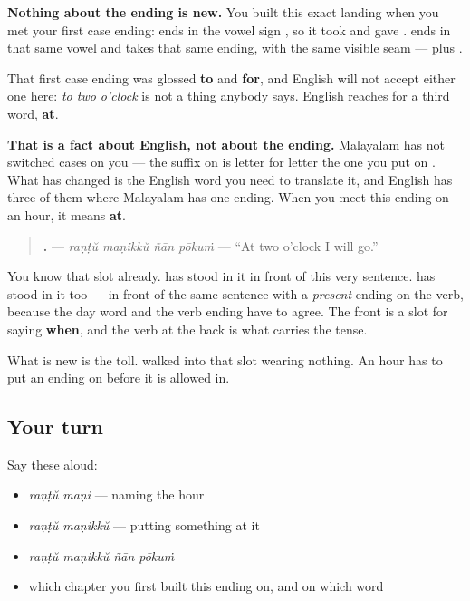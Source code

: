 \textbf{Nothing about the ending is new.} You built this exact landing when you met your first case ending: \textbf{} ends in the vowel sign \textbf{}, so it took \textbf{} and gave \textbf{}. \textbf{} ends in that same vowel and takes that same ending, with the same visible seam — \textbf{} plus \textbf{}.

\begin{culture}
That first case ending was glossed \textbf{to} and \textbf{for}, and English will not accept either one here: \emph{to two o'clock} is not a thing anybody says. English reaches for a third word, \textbf{at}.

\textbf{That is a fact about English, not about the ending.} Malayalam has not switched cases on you — the suffix on \textbf{} is letter for letter the one you put on \textbf{}. What has changed is the English word you need to translate it, and English has three of them where Malayalam has one ending. When you meet this ending on an hour, it means \textbf{at}.
\end{culture}

\begin{grammarlens}[title={Grammar Lens: the slot at the front}]
\begin{quote}
\textbf{   .} — \emph{raṇṭŭ maṇikkŭ ñān pōkuṁ} — \textquotedblleft{}At two o'clock I will go.\textquotedblright{}
\end{quote}

You know that slot already. \textbf{} has stood in it in front of this very sentence. \textbf{} has stood in it too — in front of the same sentence with a \emph{present} ending on the verb, because the day word and the verb ending have to agree. The front is a slot for saying \textbf{when}, and the verb at the back is what carries the tense.

What is new is the toll. \textbf{} walked into that slot wearing nothing. An hour has to put an ending on before it is allowed in.
\end{grammarlens}

\subsection*{Your turn}
Say these aloud:

\begin{itemize}
\raggedright
  \item \emph{raṇṭŭ maṇi} — naming the hour
  \item \emph{raṇṭŭ maṇikkŭ} — putting something at it
  \item \emph{raṇṭŭ maṇikkŭ ñān pōkuṁ}
  \item which chapter you first built this ending on, and on which word
\end{itemize}

